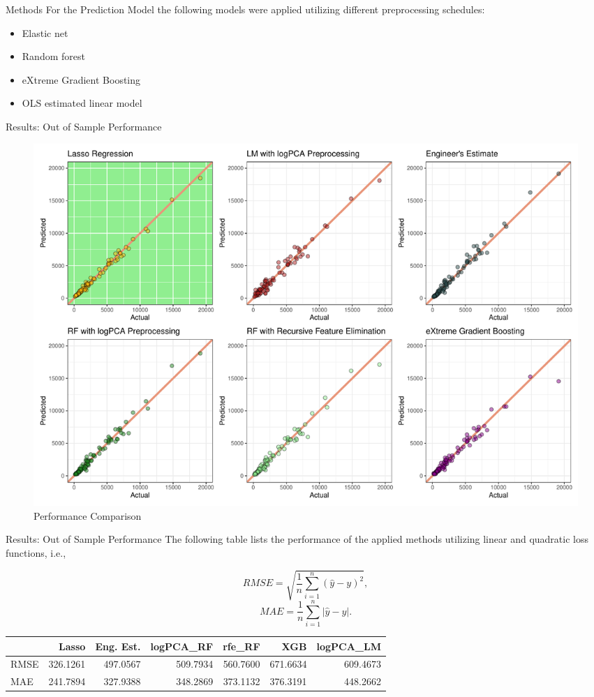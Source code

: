 \documentclass[
  11pt,
  ignorenonframetext,
]{beamer}
\providecommand{\tightlist}{%
  \setlength{\itemsep}{0pt}\setlength{\parskip}{0pt}}
\begin{document}
\begin{frame}{Methods}
\protect\hypertarget{methods}{}
For the Prediction Model the following models were applied utilizing
different preprocessing schedules:

\begin{itemize}
\tightlist
\item
  Elastic net
\item
  Random forest
\item
  eXtreme Gradient Boosting
\item
  OLS estimated linear model
\end{itemize}
\end{frame}

\begin{frame}{Results: Out of Sample Performance}
\protect\hypertarget{results-out-of-sample-performance}{}
\begin{figure}

{\centering \includegraphics[width=0.9\linewidth]{./../figures/percomp_pres} 

}

\caption{Performance Comparison}\label{fig:unnamed-chunk-3}
\end{figure}
\end{frame}

\begin{frame}{Results: Out of Sample Performance}
\protect\hypertarget{results-out-of-sample-performance-1}{}
The following table lists the performance of the applied methods
utilizing linear and quadratic loss functions, i.e.,

\[ RMSE = \sqrt{\frac{1}{n}\sum_{i = 1}^n (\hat{y} - y)^2} ,\]
\[  MAE = \frac{1}{n}\sum_{i = 1}^n |\hat{y} - y|. \]

\begin{table}
\centering\begingroup\fontsize{7}{9}\selectfont

\begin{tabular}{l|r|r|r|r|r|r}
\hline
  & Lasso & Eng. Est. & logPCA\_RF & rfe\_RF & XGB & logPCA\_LM\\
\hline
RMSE & 326.1261 & 497.0567 & 509.7934 & 560.7600 & 671.6634 & 609.4673\\
\hline
MAE & 241.7894 & 327.9388 & 348.2869 & 373.1132 & 376.3191 & 448.2662\\
\hline
\end{tabular}
\endgroup{}
\end{table}
\end{frame}
\end{document}
